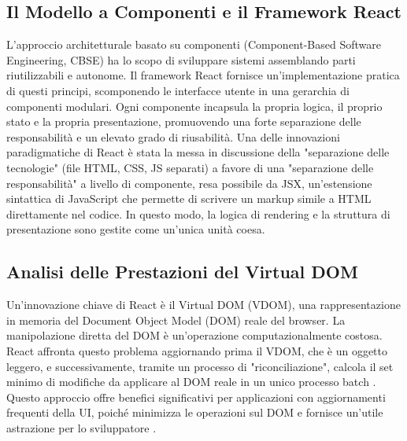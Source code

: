 \documentclass[12pt,a4paper,openright,twoside]{book}
\begin{document}
\subsection{Il Modello a Componenti e il Framework React}
L'approccio architetturale basato su componenti (Component-Based Software Engineering, CBSE) ha lo scopo di sviluppare sistemi assemblando parti riutilizzabili e autonome. Il framework React fornisce un'implementazione pratica di questi principi, scomponendo le interfacce utente in una gerarchia di componenti modulari. Ogni componente incapsula la propria logica, il proprio stato e la propria presentazione, promuovendo una forte separazione delle responsabilità e un elevato grado di riusabilità. Una delle innovazioni paradigmatiche di React è stata la messa in discussione della "separazione delle tecnologie" (file HTML, CSS, JS separati) a favore di una "separazione delle responsabilità" a livello di componente, resa possibile da JSX, un'estensione sintattica di JavaScript che permette di scrivere un markup simile a HTML direttamente nel codice. In questo modo, la logica di rendering e la struttura di presentazione sono gestite come un'unica unità coesa.

\subsection{Analisi delle Prestazioni del Virtual DOM}
Un'innovazione chiave di React è il Virtual DOM (VDOM), una rappresentazione in memoria del Document Object Model (DOM) reale del browser. La manipolazione diretta del DOM è un'operazione computazionalmente costosa. React affronta questo problema aggiornando prima il VDOM, che è un oggetto leggero, e successivamente, tramite un processo di "riconciliazione", calcola il set minimo di modifiche da applicare al DOM reale in un unico processo batch \cite{chen2019performance}. Questo approccio offre benefici significativi per applicazioni con aggiornamenti frequenti della UI, poiché minimizza le operazioni sul DOM e fornisce un'utile astrazione per lo sviluppatore \cite{chen2019performance}.
\end{document}

